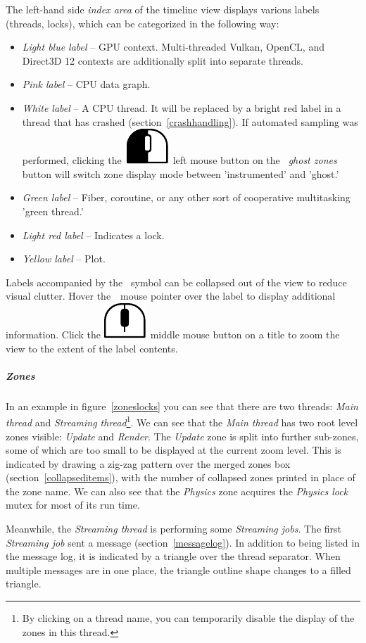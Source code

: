 \documentclass[hidelinks,titlepage,a4paper]{article}
\newcommand{\LMB}{\includegraphics[height=.8\baselineskip]{icons/lmb}}
\newcommand{\MMB}{\includegraphics[height=.8\baselineskip]{icons/mmb}}
\begin{document}
The left-hand side \emph{index area} of the timeline view displays various labels (threads, locks), which can be categorized in the following way:

\begin{itemize}
\item \emph{Light blue label} -- GPU context. Multi-threaded Vulkan, OpenCL, and Direct3D 12 contexts are additionally split into separate threads.
\item \emph{Pink label} -- CPU data graph.
\item \emph{White label} -- A CPU thread. It will be replaced by a bright red label in a thread that has crashed (section~\ref{crashhandling}). If automated sampling was performed, clicking the~\LMB{}~left mouse button on the \emph{\faGhost{}~ghost zones} button will switch zone display mode between 'instrumented' and 'ghost.'
\item \emph{Green label} -- Fiber, coroutine, or any other sort of cooperative multitasking 'green thread.'
\item \emph{Light red label} -- Indicates a lock.
\item \emph{Yellow label} -- Plot.
\end{itemize}

Labels accompanied by the \faCaretDown{}~symbol can be collapsed out of the view to reduce visual clutter. Hover the~\faMousePointer{}~mouse pointer over the label to display additional information. Click the \MMB{}~middle mouse button on a title to zoom the view to the extent of the label contents.

\subparagraph{Zones}

In an example in figure~\ref{zoneslocks} you can see that there are two threads: \emph{Main thread} and \emph{Streaming thread}\footnote{By clicking on a thread name, you can temporarily disable the display of the zones in this thread.}. We can see that the \emph{Main thread} has two root level zones visible: \emph{Update} and \emph{Render}. The \emph{Update} zone is split into further sub-zones, some of which are too small to be displayed at the current zoom level. This is indicated by drawing a zig-zag pattern over the merged zones box (section~\ref{collapseditems}), with the number of collapsed zones printed in place of the zone name. We can also see that the \emph{Physics} zone acquires the \emph{Physics lock} mutex for most of its run time.

Meanwhile, the \emph{Streaming thread} is performing some \emph{Streaming jobs}. The first \emph{Streaming job} sent a message (section~\ref{messagelog}). In addition to being listed in the message log, it is indicated by a triangle over the thread separator. When multiple messages are in one place, the triangle outline shape changes to a filled triangle.
\end{document}
